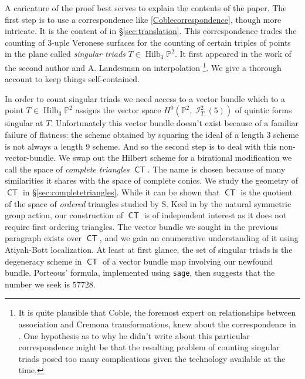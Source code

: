\documentclass[reqno, 11pt]{amsart}
\theoremstyle{plain}
\theoremstyle{remark}
\renewcommand{\P}{\mathbb{P}}
\DeclareMathOperator{\Hilb}{Hilb}
\DeclareMathOperator{\I}{\mathcal{I}}
\DeclareMathOperator{\CT}{\mathsf{CT}}
\begin{document}
A caricature of the proof best serves to explain the contents of the paper.  The first step is to use a correspondence like \eqref{Coblecorrespondence}, though more intricate. It is the content of  in \S \ref{sec:translation}.  This correspondence trades the counting of $3$-uple Veronese surfaces for the counting of certain triples of points in the plane called \emph{singular triads} $T \in \Hilb_{3}\P^{2}$.  It first appeared in the work of the second author and A. Landesman \cite{landesman2019interpolation} on interpolation \footnote{It is quite plausible that Coble, the foremost expert on relationships between  association and Cremona transformations, knew about the correspondence in .  One hypothesis as to why he didn't write about this particular correspondence might be that the resulting problem of counting singular triads posed too many complications given the technology available at the time.}.  We give a thorough account to keep things self-contained.  

In order to count singular triads we need access to a vector bundle which to a point $T \in \Hilb_{3}\P^{2}$ assigns the vector space $H^{0}(\P^{2},\I^{2}_{T}(5))$ of quintic forms singular at $T$.  Unfortunately this vector bundle doesn't exist because of a familiar failure of flatness: the scheme obtained by squaring the ideal of a length $3$ scheme is not always a length $9$ scheme.  And so the second step is to deal with this non-vector-bundle. We swap out the Hilbert scheme for a birational modification we call the space of \emph{complete triangles} $\CT$. The name is chosen because of many similarities it shares with the space of complete conics.  We study the geometry of $\CT$ in \S \ref{sec:completetriangles}.  While it can be shown that $\CT$ is the quotient of the space of \emph{ordered} triangles studied by S. Keel in \cite{keel1993functorial} by the natural symmetric group action, our construction of $\CT$ is of independent interest as it does not require first ordering triangles. The vector bundle we sought in the previous paragraph exists over $\CT$, and we gain an enumerative understanding of it using Atiyah-Bott localization.  At least at first glance, the set of singular triads is the degeneracy scheme in $\CT$ of a vector bundle map involving our newfound bundle. Porteous' formula, implemented using \texttt{sage}, then suggests that the number we seek is $57728$.  
\end{document}
